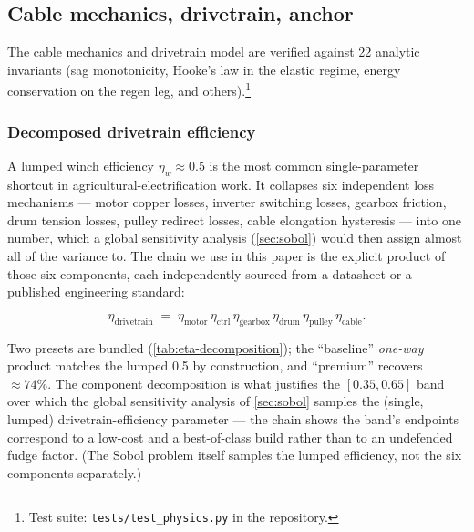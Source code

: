\documentclass[11pt,a4paper]{article}
\begin{document}
\subsection{Cable mechanics, drivetrain, anchor}\label{sec:physics}

The cable mechanics and drivetrain model are verified against 22 analytic invariants (sag monotonicity, Hooke's law in the elastic regime, energy conservation on the regen leg, and others).\footnote{Test suite: \texttt{tests/test\_physics.py} in the repository.}

\subsubsection{Decomposed drivetrain efficiency}\label{sec:drivetrain}

A lumped winch efficiency $\eta_w \approx 0.5$ is the most common single-parameter shortcut in agricultural-electrification work. It collapses six independent loss mechanisms --- motor copper losses, inverter switching losses, gearbox friction, drum tension losses, pulley redirect losses, cable elongation hysteresis --- into one number, which a global sensitivity analysis (\cref{sec:sobol}) would then assign almost all of the variance to. The chain we use in this paper is the explicit product of those six components, each independently sourced from a datasheet or a published engineering standard:

\begin{equation}\label{eq:eta-chain}
\eta_{\text{drivetrain}} \;=\; \eta_{\text{motor}} \,\eta_{\text{ctrl}}\, \eta_{\text{gearbox}} \,\eta_{\text{drum}}\, \eta_{\text{pulley}}\, \eta_{\text{cable}}.
\end{equation}

Two presets are bundled (\cref{tab:eta-decomposition}); the ``baseline'' \emph{one-way} product matches the lumped 0.5 by construction, and ``premium'' recovers ${\approx}74\%$. The component decomposition is what justifies the $[0.35, 0.65]$ band over which the global sensitivity analysis of \cref{sec:sobol} samples the (single, lumped) drivetrain-efficiency parameter --- the chain shows the band's endpoints correspond to a low-cost and a best-of-class build rather than to an undefended fudge factor. (The Sobol problem itself samples the lumped efficiency, not the six components separately.)
\end{document}
